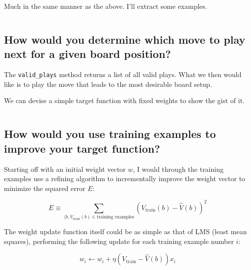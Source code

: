 \documentclass[11pt,a4paper]{article}
\begin{document}
      Much in the same manner as the above. I'll extract some examples.
      
      \inputminted[firstline=74,firstnumber=74,lastline=100,linenos=true]{python}{src/board.py}
    
    
    \subsection{How would you determine which move to play next for a given board position?} %
    \label{sub:how_would_you_determine_which_move_to_play_next_for_a_given_board_position_}
    
      The \texttt{valid\_plays} method returns a list of all valid plays.
      What we then would like is to play the move that leads to the most desirable board setup.
      
      We can devise a simple target function with fixed weights to show the gist of it.
      
      \inputminted[firstline=118,firstnumber=118,lastline=160,linenos=true,mathescape=true]{python}{src/board.py}
    
    
    \subsection{How would you use training examples to improve your target function?} %
    \label{sub:how_would_you_use_training_examples_to_improve_your_target_function_}
    
      Starting off with an initial weight vector $w$, I would through the training examples use a refining algorithm to incrementally improve the weight vector to minimize the squared error $E$:
      
      \begin{equation}
        E \equiv \sum_{\langle b, V_{\text{train}}(b) \in \text{training examples}}{ (V_\text{train}(b) - \hat{V}(b))^2 }
      \end{equation}
      
      The weight update function itself could be as simple as that of LMS (least mean squares), performing the following update for each training example number $i$:
      
      \begin{equation}
        w_i \leftarrow w_i + \eta (V_\text{train} - \hat{V}(b)) x_i
      \end{equation}
    
\end{document}
